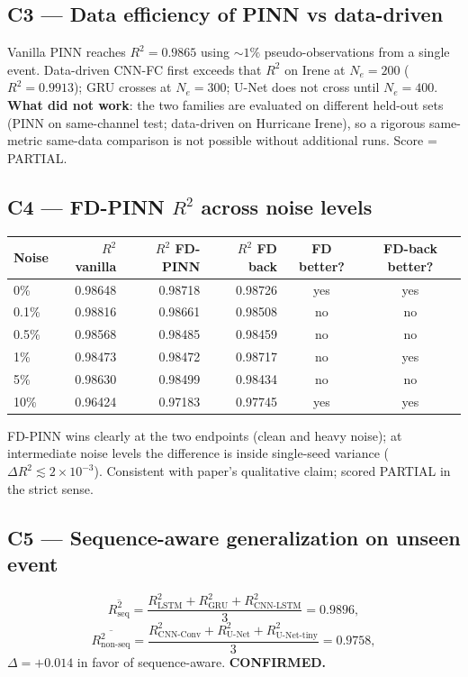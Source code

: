 \documentclass[11pt]{article}
\begin{document}
\subsection{C3 --- Data efficiency of PINN vs data-driven}
Vanilla PINN reaches $R^2 = 0.9865$ using $\sim 1\%$ pseudo-observations from a single event.
Data-driven CNN-FC first exceeds that $R^2$ on Irene at $N_e = 200$ ($R^2 = 0.9913$); GRU crosses
at $N_e = 300$; U-Net does not cross until $N_e = 400$. \\
\textbf{What did not work}: the two families are evaluated on different held-out sets (PINN on
same-channel test; data-driven on Hurricane Irene), so a rigorous same-metric same-data
comparison is not possible without additional runs. Score = PARTIAL.

\subsection{C4 --- FD-PINN $R^2$ across noise levels}
\begin{center}
\begin{tabular}{lrrrcc}
\toprule
Noise & $R^2$ vanilla & $R^2$ FD-PINN & $R^2$ FD back & FD better? & FD-back better? \\
\midrule
0\%   & 0.98648 & 0.98718 & 0.98726 & yes & yes \\
0.1\% & 0.98816 & 0.98661 & 0.98508 & no  & no  \\
0.5\% & 0.98568 & 0.98485 & 0.98459 & no  & no  \\
1\%   & 0.98473 & 0.98472 & 0.98717 & no  & yes \\
5\%   & 0.98630 & 0.98499 & 0.98434 & no  & no  \\
10\%  & 0.96424 & 0.97183 & 0.97745 & yes & yes \\
\bottomrule
\end{tabular}
\end{center}
FD-PINN wins clearly at the two endpoints (clean and heavy noise); at intermediate noise levels
the difference is inside single-seed variance ($\Delta R^2 \lesssim 2 \times 10^{-3}$).
Consistent with paper's qualitative claim; scored PARTIAL in the strict sense.

\subsection{C5 --- Sequence-aware generalization on unseen event}
$$
\overline{R^2_{\text{seq}}} = \frac{R^2_{\text{LSTM}} + R^2_{\text{GRU}} + R^2_{\text{CNN-LSTM}}}{3} = 0.9896,
$$
$$
\overline{R^2_{\text{non-seq}}} = \frac{R^2_{\text{CNN-Conv}} + R^2_{\text{U-Net}} + R^2_{\text{U-Net-tiny}}}{3} = 0.9758,
$$
$\Delta = +0.014$ in favor of sequence-aware. \textbf{CONFIRMED.}
\end{document}
